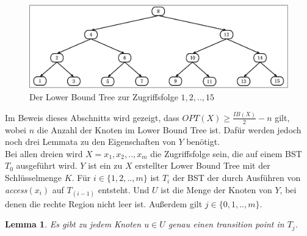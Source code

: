 \documentclass[a4paper,12pt]{article}
\newtheorem{Lemma}{Lemma}[section]
\begin{document}
\begin{figure}[H]
	\centering
	\includegraphics[width=1\textwidth]{Medien/Tango/lowerBoundTree}
	\caption{Der Lower Bound Tree zur Zugriffsfolge $1 ,2, .., 15$  }
	\label{fig:demlowerBoundTree}
\end{figure}

\noindent Im Beweis dieses Abschnitts wird gezeigt, dass $\mathit{OPT}\left(X\right) \geq \frac{\mathit{IB}\left(X\right)}{2} - n$ gilt, wobei $n$ die Anzahl der Knoten im Lower Bound Tree ist. Dafür werden jedoch noch drei Lemmata zu den Eigenschaften von $Y$ benötigt.\\
 Bei allen dreien wird $X = x_1, x_2,.., x_m$ die Zugriffsfolge sein, die auf einem BST $T_0$ ausgeführt wird. $Y$ ist ein zu $X$ erstellter Lower Bound Tree mit der Schlüsselmenge $K$.
Für $i \in \{1,2,..,m\}$ ist $T_i$ der BST der durch Ausführen von \textit{access}$\left(x_i\right)$ auf $T_{\left(i-1\right)}$ entsteht. Und $U$ ist die Menge der Knoten von $Y$, bei denen die rechte Region nicht leer ist. Außerdem gilt   $j \in \{0,1,..,m\}$.
\begin{Lemma} \label{demaineLemma1}
Es gibt zu jedem Knoten $u \in U$ genau einen transition point in $T_j$. 	
\end{Lemma}
\end{document}
